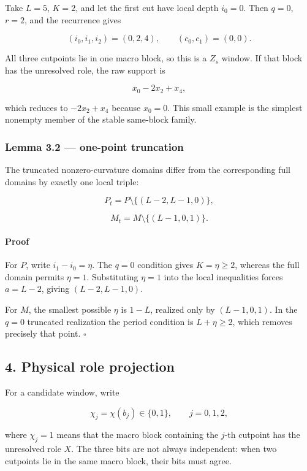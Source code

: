 \documentclass[
  british,
  a4paper,
  11pt]{article}
\newcounter{none} %
\begin{document}
Take \(L=5\), \(K=2\), and let the first cut have local depth \(i_0=0\).
Then \(q=0\), \(r=2\), and the recurrence gives

\[
(i_0,i_1,i_2)=(0,2,4),\qquad(c_0,c_1)=(0,0).
\]

All three cutpoints lie in one macro block, so this is a \(Z_s\) window.
If that block has the unresolved role, the raw support is

\[
x_0-2x_2+x_4,
\]

which reduces to \(-2x_2+x_4\) because \(x_0=0\). This small example is
the simplest nonempty member of the stable same-block family.

\subsubsection{Lemma 3.2 --- one-point
truncation}\label{lemma-3.2-one-point-truncation}

The truncated nonzero-curvature domains differ from the corresponding
full domains by exactly one local triple:

\[
P_t
=
P\setminus\{(L-2,L-1,0)\},
\tag{3.13}
\]

\[
M_t
=
M\setminus\{(L-1,0,1)\}.
\tag{3.14}
\]

\paragraph{Proof}\label{proof-1}

For \(P\), write \(i_1-i_0=\eta\). The \(q=0\) condition gives
\(K=\eta\ge2\), whereas the full domain permits \(\eta=1\). Substituting
\(\eta=1\) into the local inequalities forces \(a=L-2\), giving
\((L-2,L-1,0)\).

For \(M\), the smallest possible \(\eta\) is \(1-L\), realized only by
\((L-1,0,1)\). In the \(q=0\) truncated realization the period condition
is \(L+\eta\ge2\), which removes precisely that point. \(\square\)

\subsection{4. Physical role projection}\label{physical-role-projection}

For a candidate window, write

\[
\chi_j=\chi(b_j)\in\{0,1\},
\qquad j=0,1,2,
\]

where \(\chi_j=1\) means that the macro block containing the \(j\)-th
cutpoint has the unresolved role \(X\). The three bits are not always
independent: when two cutpoints lie in the same macro block, their bits
must agree.
\end{document}
